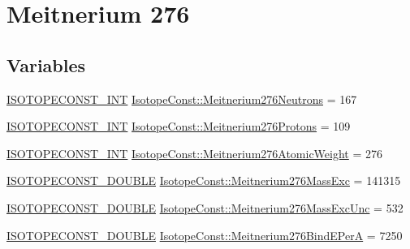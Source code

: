 \hypertarget{group___isotope_const-_meitnerium-_mt276}{}\section{Meitnerium 276}
\label{group___isotope_const-_meitnerium-_mt276}
\subsection*{Variables}
\begin{DoxyCompactItemize}
\item 
\mbox{\hyperlink{group___isotope_const-_macros_ga5f18360b3e99483a35c32d789e62621c}{I\+S\+O\+T\+O\+P\+E\+C\+O\+N\+S\+T\+\_\+\+I\+NT}} \mbox{\hyperlink{group___isotope_const-_meitnerium-_mt276_ga56bc323cc3c00e189c9d78338ca899aa}{Isotope\+Const\+::\+Meitnerium276\+Neutrons}} = 167
\item 
\mbox{\hyperlink{group___isotope_const-_macros_ga5f18360b3e99483a35c32d789e62621c}{I\+S\+O\+T\+O\+P\+E\+C\+O\+N\+S\+T\+\_\+\+I\+NT}} \mbox{\hyperlink{group___isotope_const-_meitnerium-_mt276_gad70a1d0e6f1df2903f47e9a869d5d596}{Isotope\+Const\+::\+Meitnerium276\+Protons}} = 109
\item 
\mbox{\hyperlink{group___isotope_const-_macros_ga5f18360b3e99483a35c32d789e62621c}{I\+S\+O\+T\+O\+P\+E\+C\+O\+N\+S\+T\+\_\+\+I\+NT}} \mbox{\hyperlink{group___isotope_const-_meitnerium-_mt276_ga57f864defdab4fe69880e9f69bdf8774}{Isotope\+Const\+::\+Meitnerium276\+Atomic\+Weight}} = 276
\item 
\mbox{\hyperlink{group___isotope_const-_macros_ga8f45a7272ce02c0b4c65c44636ed719a}{I\+S\+O\+T\+O\+P\+E\+C\+O\+N\+S\+T\+\_\+\+D\+O\+U\+B\+LE}} \mbox{\hyperlink{group___isotope_const-_meitnerium-_mt276_gae7a62fe012ae99e4174fbacb908f3e30}{Isotope\+Const\+::\+Meitnerium276\+Mass\+Exc}} = 141315
\item 
\mbox{\hyperlink{group___isotope_const-_macros_ga8f45a7272ce02c0b4c65c44636ed719a}{I\+S\+O\+T\+O\+P\+E\+C\+O\+N\+S\+T\+\_\+\+D\+O\+U\+B\+LE}} \mbox{\hyperlink{group___isotope_const-_meitnerium-_mt276_ga9e3f887e2b7409bcf8df2178fd420edc}{Isotope\+Const\+::\+Meitnerium276\+Mass\+Exc\+Unc}} = 532
\item 
\mbox{\hyperlink{group___isotope_const-_macros_ga8f45a7272ce02c0b4c65c44636ed719a}{I\+S\+O\+T\+O\+P\+E\+C\+O\+N\+S\+T\+\_\+\+D\+O\+U\+B\+LE}} \mbox{\hyperlink{group___isotope_const-_meitnerium-_mt276_gab8c32dc0c3cb96a9dbd3183dbb9c5179}{Isotope\+Const\+::\+Meitnerium276\+Bind\+E\+PerA}} = 7250
\item 

\end{DoxyCompactItemize}
